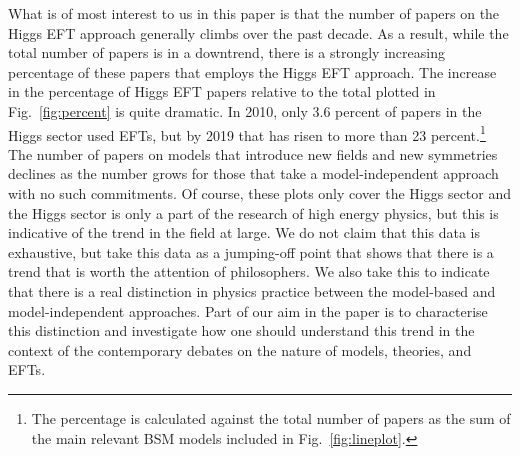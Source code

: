 What is of most interest to us in this paper is that the number of papers on the Higgs EFT approach generally climbs over the past decade. 
As a result, while the total number of papers is in a downtrend, there is a strongly increasing percentage of these papers that employs the Higgs EFT approach. 
The increase in the percentage of Higgs EFT papers relative to the total plotted in Fig.~\ref{fig:percent} is quite dramatic.
In 2010, only 3.6 percent of papers in the Higgs sector used EFTs, but by 2019 that has risen to more than 23 percent.\footnote{The percentage is calculated against the total number of papers as the sum of the main relevant BSM models included in Fig.~\ref{fig:lineplot}.}
The number of papers on models that introduce new fields and new symmetries declines as the number grows for those that take a model-independent approach with no such commitments. 
Of course, these plots only cover the Higgs sector and the Higgs sector is only a part of the research of high energy physics, but this is indicative of the trend in the field at large. 
We do not claim that this data is exhaustive, but take this data as a jumping-off point that shows that there is a trend that is worth the attention of philosophers.
We also take this to indicate that there is a real distinction in physics practice between the model-based and model-independent approaches.  
Part of our aim in the paper is to characterise this distinction and investigate how one should understand this trend in the context of the contemporary debates on the nature of models, theories, and EFTs.
